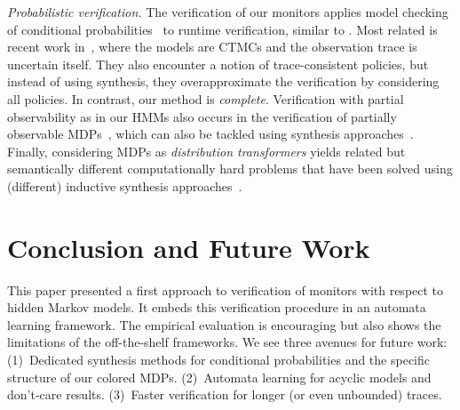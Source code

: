 \documentclass[runningheads]{llncs}
\newcommand{\lm}[2][]{\todo[color=cyan!50!white,#1]{\footnotesize{Luko: #2}}}
\renewcommand{\paragraph}[1]{\smallskip\noindent\emph{#1}}
\begin{document}

\paragraph{Probabilistic verification.}
The verification of our monitors applies model checking of conditional probabilities~\cite{DBLP:conf/tacas/AndresR08,baierComputingConditionalProbabilities2014} to runtime verification, similar to \cite{jungesRuntimeMonitorsMarkov2021,DBLP:conf/tacas/BadingsVJSJ24}. Most related is recent work in~\cite{DBLP:conf/tacas/BadingsVJSJ24}, where the models are CTMCs and the observation trace is uncertain itself. They also encounter a notion of trace-consistent policies, but instead of using synthesis, they overapproximate the verification by considering all policies. In contrast, our method is \emph{complete}. Verification with partial observability as in our HMMs also occurs in the verification of partially observable MDPs~\cite{DBLP:journals/corr/abs-2405-13583}, which can also be tackled using synthesis approaches~\cite{DBLP:conf/cav/AndriushchenkoBCJKM23}. Finally, considering MDPs as \emph{distribution transformers} yields related but semantically different computationally hard problems that have been solved using (different) inductive synthesis approaches~\cite{DBLP:conf/cav/AkshayCMZ23,DBLP:conf/ijcai/0001CMZ24}.


\section{Conclusion and Future Work}
This paper presented a first approach to verification of monitors with respect to hidden Markov models. It embeds this verification procedure in an automata learning framework. The empirical evaluation is encouraging but also shows the limitations of the off-the-shelf frameworks. We see three avenues for future work: (1)~Dedicated synthesis methods for conditional probabilities and the specific structure of our colored MDPs. (2)~Automata learning for acyclic models and don't-care results.
(3)~Faster verification for longer (or even unbounded) traces.
\end{document}
